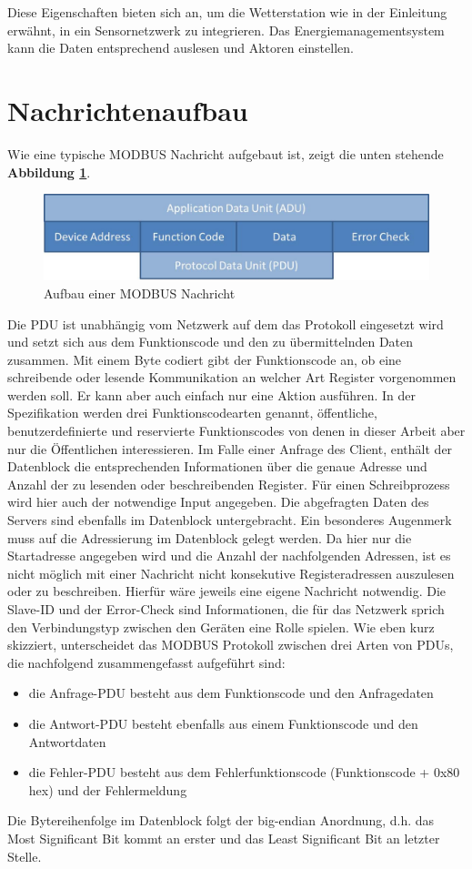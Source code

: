 Diese Eigenschaften bieten sich an, um die Wetterstation wie in der Einleitung erwähnt, in ein Sensornetzwerk zu integrieren. Das Energiemanagementsystem kann die Daten entsprechend auslesen und Aktoren einstellen.
\section{Nachrichtenaufbau}
Wie eine typische MODBUS Nachricht aufgebaut ist, zeigt die unten stehende \textbf{Abbildung \ref{fig:modbusmessage}}. 
\begin{figure}[h]
\centering
\includegraphics[scale=0.65]{modbus/ADUPDU}
\caption{Aufbau einer MODBUS Nachricht}
\label{fig:modbusmessage}
\end{figure} 
Die PDU ist unabhängig vom Netzwerk auf dem das Protokoll eingesetzt wird und setzt sich aus dem Funktionscode und den zu übermittelnden Daten zusammen. Mit einem Byte codiert gibt der Funktionscode an, ob eine schreibende oder lesende Kommunikation an welcher Art Register vorgenommen werden soll. Er kann aber auch einfach nur eine Aktion ausführen. In der Spezifikation werden drei Funktionscodearten genannt, öffentliche, benutzerdefinierte und reservierte Funktionscodes von denen in dieser Arbeit aber nur die Öffentlichen interessieren. Im Falle einer Anfrage des Client, enthält der Datenblock die entsprechenden Informationen über die genaue Adresse und Anzahl der zu lesenden oder beschreibenden Register. Für einen Schreibprozess wird hier auch der notwendige Input angegeben. Die abgefragten Daten des Servers sind ebenfalls im Datenblock untergebracht. Ein besonderes Augenmerk muss auf die Adressierung im Datenblock gelegt werden. Da hier nur die Startadresse angegeben wird und die Anzahl der nachfolgenden Adressen, ist es nicht möglich mit einer Nachricht nicht konsekutive Registeradressen auszulesen oder zu beschreiben. Hierfür wäre jeweils eine eigene Nachricht notwendig. Die Slave-ID und der Error-Check sind Informationen, die für das Netzwerk sprich den Verbindungstyp zwischen den Geräten eine Rolle spielen. Wie eben kurz skizziert, unterscheidet das MODBUS Protokoll zwischen drei Arten von PDUs, die nachfolgend zusammengefasst aufgeführt sind:
\begin{itemize}
\item die Anfrage-PDU besteht aus dem Funktionscode und den Anfragedaten
\item die Antwort-PDU besteht ebenfalls aus einem Funktionscode und den Antwortdaten
\item die Fehler-PDU besteht aus dem Fehlerfunktionscode (Funktionscode + 0x80 hex) und der Fehlermeldung 
\end{itemize}
Die Bytereihenfolge im Datenblock folgt der big-endian Anordnung, d.h. das Most Significant Bit kommt an erster und das Least Significant Bit an letzter Stelle. 
